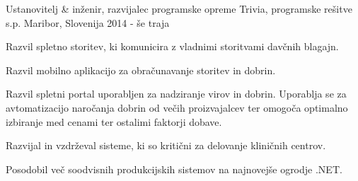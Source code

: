 \begin{cventries}
  \cventry
    {Ustanovitelj \& inženir, razvijalec programske opreme} %
    {Trivia, programske rešitve s.p.} %
    {Maribor, Slovenija} %
    {2014 - še traja} %
    {
      \begin{cvitems} %
        \item {Razvil spletno storitev, ki komunicira z vladnimi storitvami
         davčnih blagajn.}
        \item {Razvil mobilno aplikacijo za obračunavanje storitev in dobrin.}
        \item {Razvil spletni portal uporabljen za nadziranje virov in dobrin.
         Uporablja se za avtomatizacijo naročanja dobrin od večih
          proizvajalcev ter omogoča optimalno izbiranje med cenami
           ter ostalimi faktorji dobave.}
        \item {Razvijal in vzdrževal sisteme, ki so kritični za delovanje
         kliničnih centrov.}
         \item {Posodobil več soodvisnih produkcijskih sistemov na najnovejše ogrodje .NET. }
      \end{cvitems}
    }

\end{cventries}
